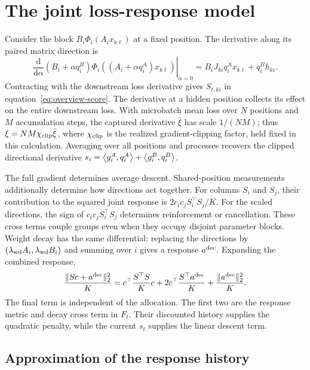 \section{The joint loss-response model}
\label{sec:loss-measurements}

Consider the block $B_i\Phi_i(A_ix_{k\ell})$ at a fixed position.
The derivative along its paired matrix direction is
\begin{equation}
 \left.\frac{\mathrm d}{\mathrm d\alpha}
 (B_i+\alpha q_i^B)\Phi_i((A_i+\alpha q_i^A)x_{k\ell})
 \right|_{\alpha=0}
 = B_iJ_{ki}q_i^Ax_{k\ell}+q_i^Bh_{ki}.
 \label{eq:functional-score}
\end{equation}
Contracting with the downstream loss derivative gives $S_{t,ki}$
in equation~\ref{eq:overview-score}. The derivative at a hidden
position collects its effect on the entire downstream loss. With
microbatch mean loss over $N$ positions and $M$ accumulation steps,
the captured derivative $\bar\xi$ has scale $1/(NM)$; thus
$\xi=NM\chi_{\rm clip}\bar\xi$, where $\chi_{\rm clip}$ is the
realized gradient-clipping factor, held fixed in this calculation.
Averaging over all positions and processes recovers the clipped
directional derivative
$s_i=\left\langle g_i^A,q_i^A\right\rangle+\left\langle g_i^B,q_i^B\right\rangle$.

The full gradient determines average descent. Shared-position
measurements additionally determine how directions act together.
For columns $S_i$ and $S_j$, their contribution to the squared
joint response is $2c_ic_jS_i^\top S_j/K$.
For the scaled directions, the sign of $c_ic_jS_i^\top S_j$
determines reinforcement or cancellation. These cross terms couple
groups even when they occupy
disjoint parameter blocks. Weight decay has the same differential:
replacing the directions by $(\lambda_{\rm wd} A_i,\lambda_{\rm wd} B_i)$ and summing
over $i$ gives a response $a^{\rm dec}$. Expanding the combined response,
\begin{equation}
 \frac{\|Sc+a^{\rm dec}\|_2^2}{K}
 =c^\top\frac{S^\top S}{K}c
 +2c^\top\frac{S^\top a^{\rm dec}}{K}
 +\frac{\|a^{\rm dec}\|_2^2}{K}.
 \label{eq:functional-response-energy}
\end{equation}
The final term is independent of the allocation. The first two are
the response metric and decay cross term in $F_t$. Their discounted
history supplies the quadratic penalty, while the current $s_t$
supplies the linear descent term.

\subsection{Approximation of the response history}
\label{sec:ledger}

